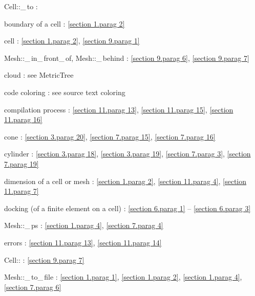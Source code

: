 \documentclass[a4paper,oneside]{scrbook}
\def\numb{}
\newcommand\verm[1]{\textcolor{manif}{#1}}
\renewcommand\tt{\normalfont\ttfamily}
\begin{document}



\noindent
{\small\tt\verm{Cell}::\_\,to} : 

\noindent
boundary of a cell : \ref{\numb section 1.\numb parag 2}

\noindent
cell : \ref{\numb section 1.\numb parag 2}, \ref{\numb section 9.\numb parag 1}

\noindent
{\small\tt\verm{Mesh}::\_\,in\_\,front\_\,of},
{\small\tt\verm{Mesh}::\_\,behind} : \ref{\numb section 9.\numb parag 6},
\ref{\numb section 9.\numb parag 7}

\noindent
cloud : see {\small\tt\verm{MetricTree}}

\noindent
code coloring : see source text coloring


\noindent
compilation process : \ref{\numb section 11.\numb parag 13},
\ref{\numb section 11.\numb parag 15}, \ref{\numb section 11.\numb parag 16}

\noindent
cone : \ref{\numb section 3.\numb parag 20}, \ref{\numb section 7.\numb parag 15},
\ref{\numb section 7.\numb parag 16}

\noindent
cylinder : \ref{\numb section 3.\numb parag 18}, \ref{\numb section 3.\numb parag 19},
\ref{\numb section 7.\numb parag 3}, \ref{\numb section 7.\numb parag 19}

\noindent
dimension of a cell or mesh : \ref{\numb section 1.\numb parag 2},
\ref{\numb section 11.\numb parag 4}, \ref{\numb section 11.\numb parag 7}

\noindent
docking (of a finite element on a cell) :
\ref{\numb section 6.\numb parag 1} -- \ref{\numb section 6.\numb parag 3}

\noindent
{\small\tt\verm{Mesh}::\_\,ps} : \ref{\numb section 1.\numb parag 4},
\ref{\numb section 7.\numb parag 4}

\noindent
errors : \ref{\numb section 11.\numb parag 13}, \ref{\numb section 11.\numb parag 14}

\noindent
{\small\tt\verm{Cell}::} : \ref{\numb section 9.\numb parag 7}

\noindent
{\small\tt\verm{Mesh}::\_\,to\_\,file} : \ref{\numb section 1.\numb parag 1},
\ref{\numb section 1.\numb parag 2}, \ref{\numb section 1.\numb parag 4},
\ref{\numb section 7.\numb parag 6}
\end{document}
